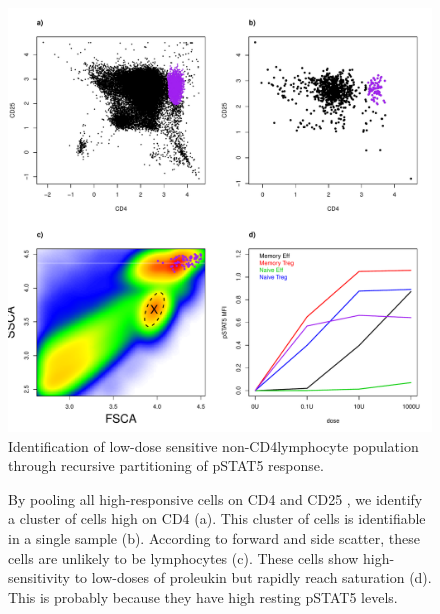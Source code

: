 \hspace{-2cm}
\begin{figure}[h]
\centering
\includegraphics[scale=.5]{IL2/figures/new-cell-subset.pdf}
{ Identification of low-dose sensitive non-CD4\positive lymphocyte population through recursive partitioning of pSTAT5 response. }
{
  By pooling all high-responsive cells on CD4 and CD25 , we identify a cluster of cells high on CD4 (a).
  This cluster of cells is identifiable in a single sample (b).
  According to forward and side scatter, these cells are unlikely to be lymphocytes (c).
  These cells show high-sensitivity to low-doses of proleukin but rapidly reach saturation (d).
  This is probably because they have high resting pSTAT5 levels.
  
}
\end{figure}






